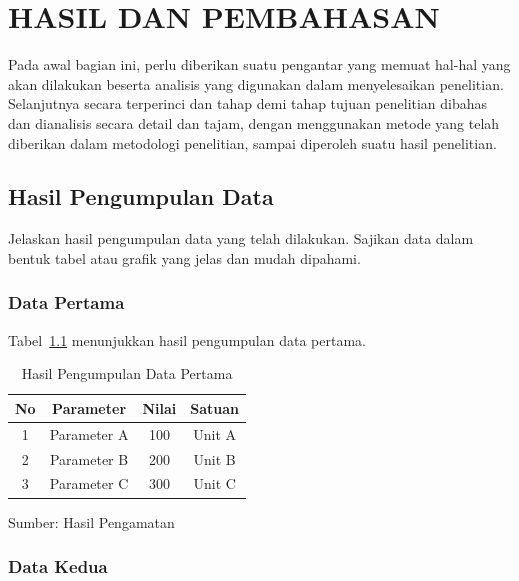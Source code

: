 
\chapter{HASIL DAN PEMBAHASAN}

Pada awal bagian ini, perlu diberikan suatu pengantar yang memuat hal-hal yang akan dilakukan beserta analisis yang digunakan dalam menyelesaikan penelitian. Selanjutnya secara terperinci dan tahap demi tahap tujuan penelitian dibahas dan dianalisis secara detail dan tajam, dengan menggunakan metode yang telah diberikan dalam metodologi penelitian, sampai diperoleh suatu hasil penelitian.

\section{Hasil Pengumpulan Data}

Jelaskan hasil pengumpulan data yang telah dilakukan. Sajikan data dalam bentuk tabel atau grafik yang jelas dan mudah dipahami.

\subsection{Data Pertama}

Tabel~\ref{tab:data-pertama} menunjukkan hasil pengumpulan data pertama.

\begin{table}[htbp]
    \caption{Hasil Pengumpulan Data Pertama}
    \label{tab:data-pertama}
    \centering
    \begin{tabular}{|c|c|c|c|}
        \hline
        \textbf{No} & \textbf{Parameter} & \textbf{Nilai} & \textbf{Satuan} \\
        \hline
        1 & Parameter A & 100 & Unit A \\
        \hline
        2 & Parameter B & 200 & Unit B \\
        \hline
        3 & Parameter C & 300 & Unit C \\
        \hline
    \end{tabular}
    
    \vspace{0.3cm}
    \footnotesize{Sumber: Hasil Pengamatan}
\end{table}

\subsection{Data Kedua}


